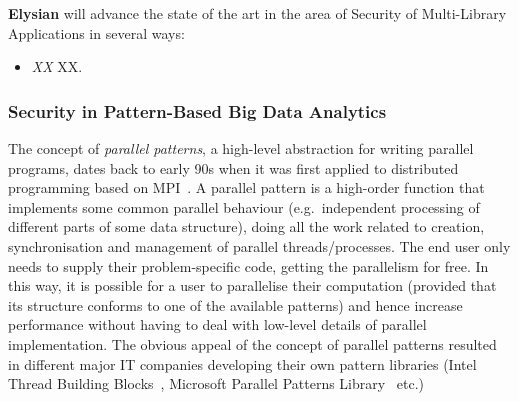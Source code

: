 \documentclass[a4paper,11pt]{article}
\newcommand{\project}[1]{\textbf{#1}\xspace}
\newcommand{\SECURITY}{\project{Elysian}}
\newcommand{\TheProject}{\SECURITY}
\begin{document}
\begin{mdframed}[backgroundcolor=gray!10]
\TheProject{} will advance the state of the art in the area of Security of Multi-Library Applications in several ways:
\begin{itemize}

\item \emph{XX} XX.
\end{itemize}
\end{mdframed}

\subsubsection{Security in Pattern-Based Big Data Analytics}
\label{sect:patterns}

The concept of \emph{parallel patterns}, a high-level abstraction for writing parallel programs, dates back to early 90s when it was first applied to distributed programming based on MPI~\cite{cole89skeletons}. A parallel pattern is a high-order function that implements some common parallel behaviour (e.g.~independent processing of different parts of some data structure), doing all the work related to creation, synchronisation and management of parallel threads/processes. The end user only needs to supply their problem-specific code, getting the parallelism for free. In this way, it is possible for a user to parallelise their computation (provided that its structure conforms to one of the available patterns) and hence increase performance without having to deal with low-level details of parallel implementation. The obvious appeal of the concept of parallel patterns resulted in different major IT companies developing their own pattern libraries (Intel Thread Building Blocks~\cite{tbb}, Microsoft Parallel Patterns Library~\cite{ppl} etc.)

\end{document}
